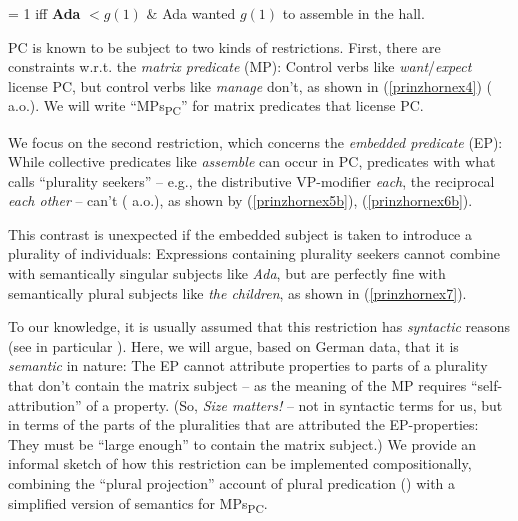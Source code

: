 \documentclass[output=paper,colorlinks,citecolor=brown,
]{langscibook}
\begin{document}
\ea	\label{prinzhornex3}  = 1 iff \textbf{Ada} $< g(1)$ $\&$ Ada wanted $g(1)$ to assemble in the hall. \z

PC is known to be subject to two kinds of restrictions. First, there are constraints w.r.t. the {\it matrix predicate} (MP): Control verbs like {\it want}/{\it expect} license PC, but control verbs like {\it  manage} don't, as shown in (\ref{prinzhornex4}) (\citealt{Landau:2000, Pearson:2016} a.o.). We will write “MPs\textsubscript{PC}” for matrix predicates that license PC.

\z
	
We focus on the second restriction, which concerns the {\it embedded predicate} (EP): While collective predicates like  {\it assemble} can occur in PC, predicates with what \cite{Schwarzschild:1996} calls “plurality seekers” -- e.g., the distributive VP-mod\-i\-fi\-er {\it each}, the reciprocal  {\it each other} -- can't (\citealt{Landau:2000} a.o.), as shown by (\ref{prinzhornex5b}), (\ref{prinzhornex6b}).

\ea\label{prinzhornex5}
\z\z

This contrast is unexpected if the embedded subject is taken to introduce a plurality of individuals: Expressions containing plurality seekers cannot combine with semantically singular subjects like {\it Ada}, but are perfectly fine with semantically plural subjects like {\it the children}, as shown in (\ref{prinzhornex7}).

\ea \label{prinzhornex7}
\z\z

To our knowledge, it is usually assumed that this restriction has {\it syntactic} reasons (see in particular \citealt{Landau:2000}). Here, we will argue, based on German data, that it is {\it semantic} in nature: The EP cannot attribute properties to parts of a plurality that don't contain the matrix subject --  as the meaning of the MP requires “self-attribution” of a property. (So, \textit{Size matters!} -- not in syntactic terms for us, but in terms of the parts of the pluralities that are attributed the EP-properties: They must be “large enough” to contain the matrix subject.) We provide an informal sketch of how this restriction can be implemented compositionally, combining  the “plural projection” account of plural predication (\citealt{Schmitt:2019, Haslinger:2018a, Haslinger:2018b}) with a simplified version of \cite{Pearson:2016} semantics for MPs\textsubscript{PC}.
\end{document}
